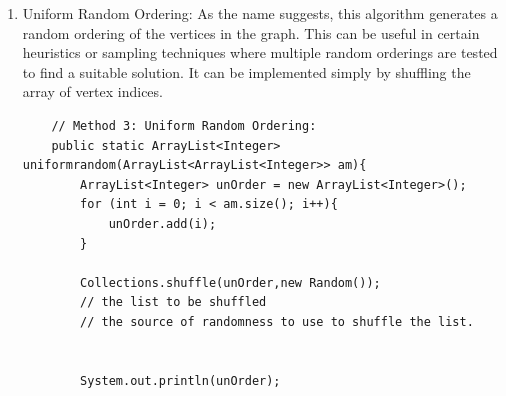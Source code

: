 \documentclass{article}
\begin{document}
\begin{enumerate}
\item Uniform Random Ordering: As the name suggests, this algorithm generates a random ordering of the vertices in the graph. This can be useful in certain heuristics or sampling techniques where multiple random orderings are tested to find a suitable solution. It can be implemented simply by shuffling the array of vertex indices.
    \begin{verbatim}
    // Method 3: Uniform Random Ordering:
    public static ArrayList<Integer> uniformrandom(ArrayList<ArrayList<Integer>> am){
        ArrayList<Integer> unOrder = new ArrayList<Integer>();
        for (int i = 0; i < am.size(); i++){
            unOrder.add(i);
        }

        Collections.shuffle(unOrder,new Random());
        // the list to be shuffled
        // the source of randomness to use to shuffle the list.


        System.out.println(unOrder);



\end{verbatim}
\end{enumerate}
\end{document}
